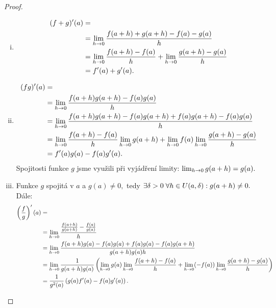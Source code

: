 \begin{proof}
    \leavevmode
    \begin{enumerate}[i.]
        \item 
            \begin{align*}
                (f+g)'(a) &= \\
                          &= \lim_{h \to 0} \frac{f(a+h) + g(a + h) - f(a) - g(a)}{h}  \\
                &= \lim_{h \to 0} \frac{f(a+h) - f(a)}{h} + \lim_{h \to 0} \frac{g(a+h) - g(a)}{h} \\
                &= f'(a) + g'(a).
            \end{align*}

        \item \begin{align*}
                (fg)'(a) &= \\
                &=\lim_{h \to 0} \frac{f(a+h)g(a+h) - f(a)g(a)}{h} \\
                &=\lim_{h \to 0} \frac{f(a+h)g(a+h) - f(a)g(a+h) + f(a)g(a+h) - f(a)g(a)}{h} \\
                &=\lim_{h \to 0} \frac{f(a+h)-f(a)}{h}  \lim_{h \to 0} g(a+h)  + 
                \lim_{h \to 0} f(a) \lim_{h \to 0} \frac{g(a+h)-g(a)}{h} \\
                &= f'(a)g(a) -f(a)g'(a).
            \end{align*}
                Spojitosti funkce $g$ jsme využili při vyjádření limity: 
            $\lim_{h \to 0} g(a+h) = g(a).$

        \item Funkce $g$ spojitá v $a$ a $g(a) \neq 0,$ tedy $\exists \delta >0 \;
            \forall h \in U(a,\delta): g(a+h) \neq 0.$ Dále:
            \begin{align*}
                \left(\frac{f}{g}\right)'(a) &= \\
                &= \lim_{h \to 0} \frac{\frac{f(a+h)}{g(a+h)}-\frac{f(a)}{g(a)}}{h} \\
                &= \lim_{h \to 0} \frac{f(a+h)g(a) - f(a)g(a) + f(a)g(a) -f(a)g(a+h)}{g(a+h)g(a)h} \\
                &= \lim_{h \to 0} \frac{1}{g(a+h)g(a)}  
                \left( \lim_{h \to 0} g(a) \lim_{h \to 0} \frac{f(a+h) - f(a)}{h}
                +\lim_{h \to 0} (-f(a)) \lim_{h \to 0} \frac{g(a+h) - g(a)}{h}\right) \\
                &= \frac{1}{g^2(a)} \left(g(a)f'(a) - f(a)g'(a)\right).
            \end{align*}
    \end{enumerate}
\end{proof}

